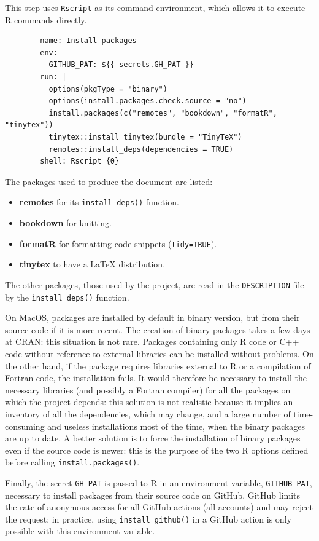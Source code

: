\documentclass[
  12pt,
  american,
  a4paper,
  extrafontsizes,onecolumn,openright
  ]{memoir}
\providecommand{\tightlist}{%
  \setlength{\itemsep}{0pt}\setlength{\parskip}{0pt}}
\begin{document}
This step uses \texttt{Rscript} as its command environment, which allows it to execute R commands directly.

\begin{verbatim}
      - name: Install packages
        env:
          GITHUB_PAT: ${{ secrets.GH_PAT }}
        run: |
          options(pkgType = "binary")
          options(install.packages.check.source = "no")
          install.packages(c("remotes", "bookdown", "formatR", "tinytex"))
          tinytex::install_tinytex(bundle = "TinyTeX")
          remotes::install_deps(dependencies = TRUE)
        shell: Rscript {0}
\end{verbatim}

The packages used to produce the document are listed:

\begin{itemize}
\tightlist
\item
  \textbf{remotes} for its \texttt{install\_deps()} function.
\item
  \textbf{bookdown} for knitting.
\item
  \textbf{formatR} for formatting code snippets (\texttt{tidy=TRUE}).
\item
  \textbf{tinytex} to have a LaTeX distribution.
\end{itemize}

The other packages, those used by the project, are read in the \texttt{DESCRIPTION} file by the \texttt{install\_deps()} function.

On MacOS, packages are installed by default in binary version, but from their source code if it is more recent.
The creation of binary packages takes a few days at CRAN: this situation is not rare.
Packages containing only R code or C++ code without reference to external libraries can be installed without problems.
On the other hand, if the package requires libraries external to R or a compilation of Fortran code, the installation fails.
It would therefore be necessary to install the necessary libraries (and possibly a Fortran compiler) for all the packages on which the project depends: this solution is not realistic because it implies an inventory of all the dependencies, which may change, and a large number of time-consuming and useless installations most of the time, when the binary packages are up to date.
A better solution is to force the installation of binary packages even if the source code is newer: this is the purpose of the two R options defined before calling \texttt{install.packages()}.

Finally, the secret \texttt{GH\_PAT} is passed to R in an environment variable, \texttt{GITHUB\_PAT}, necessary to install packages from their source code on GitHub.
GitHub limits the rate of anonymous access for all GitHub actions (all accounts) and may reject the request: in practice, using \texttt{install\_github()} in a GitHub action is only possible with this environment variable.
\end{document}
